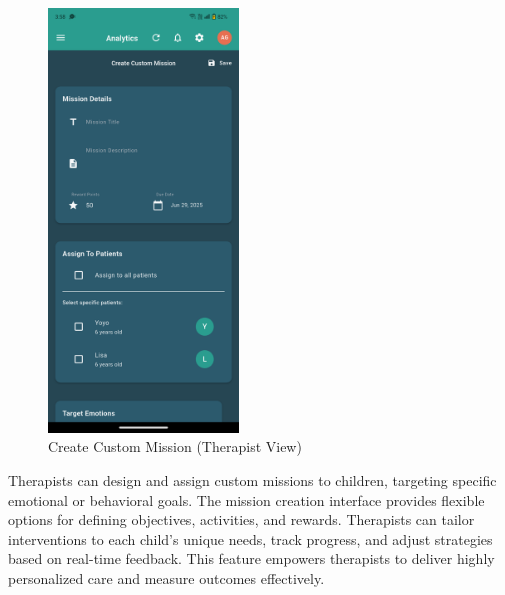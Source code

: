 ﻿\documentclass[12pt,a4paper]{article}
\begin{document}
\begin{figure}[H]
    \centering
    \includegraphics[width=0.45\textwidth]{Screenshots/createcustommissiontherapist.png}
    \caption{Create Custom Mission (Therapist View)}
    \label{fig:create-mission-therapist}
\end{figure}
Therapists can design and assign custom missions to children, targeting specific emotional or behavioral goals. The mission creation interface provides flexible options for defining objectives, activities, and rewards. Therapists can tailor interventions to each child's unique needs, track progress, and adjust strategies based on real-time feedback. This feature empowers therapists to deliver highly personalized care and measure outcomes effectively.
\end{document}
